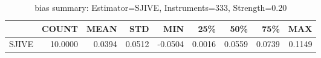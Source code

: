 \begin{table}[ht]
\centering
\caption{bias summary: Estimator=SJIVE, Instruments=333, Strength=0.20}
\begin{tabular}{lrrrrrrrr}
\toprule
 & COUNT & MEAN & STD & MIN & 25\% & 50\% & 75\% & MAX \\
\midrule
SJIVE & 10.0000 & 0.0394 & 0.0512 & -0.0504 & 0.0016 & 0.0559 & 0.0739 & 0.1149 \\
\bottomrule
\end{tabular}
\end{table}
